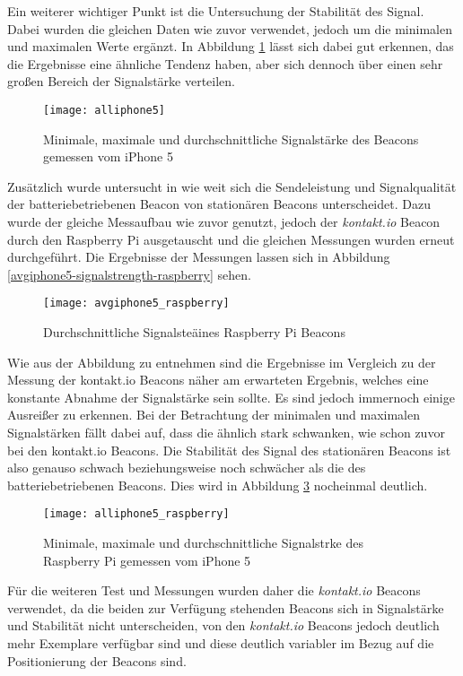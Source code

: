 Ein weiterer wichtiger Punkt ist die Untersuchung der Stabilität des Signal. Dabei wurden die gleichen Daten wie zuvor verwendet, jedoch um die minimalen und maximalen Werte ergänzt. In Abbildung \ref{all-iphone5} lässt sich dabei gut erkennen, das die Ergebnisse eine ähnliche Tendenz haben, aber sich dennoch über einen sehr großen Bereich der Signalstärke verteilen.

\begin{figure}[htb!]
		\centering
	\texttt{[image: alliphone5]}
	\caption{Minimale, maximale und durchschnittliche Signalstärke des Beacons gemessen vom iPhone 5}
	\label{all-iphone5}
\end{figure}


Zusätzlich wurde untersucht in wie weit sich die Sendeleistung und Signalqualität der batteriebetriebenen Beacon von stationären Beacons unterscheidet.
Dazu wurde der gleiche Messaufbau wie zuvor genutzt, jedoch der \emph{kontakt.io} Beacon durch den Raspberry Pi ausgetauscht und die gleichen Messungen wurden erneut durchgeführt. Die Ergebnisse der Messungen lassen sich in Abbildung \ref{avgiphone5-signalstrength-raspberry} sehen.

\begin{figure}[htb!]
		\centering
	\texttt{[image: avgiphone5\_raspberry]}
	\caption{Durchschnittliche Signalsteäines Raspberry Pi Beacons}
		\label{avgiphone5_raspberry}
\end{figure}

Wie aus der Abbildung zu entnehmen sind die Ergebnisse im Vergleich zu der Messung der kontakt.io Beacons näher am erwarteten Ergebnis, welches eine konstante Abnahme der Signalstärke sein sollte. Es sind jedoch immernoch einige Ausreißer zu erkennen. Bei der Betrachtung der minimalen und maximalen Signalstärken fällt dabei auf, dass die ähnlich stark schwanken, wie schon zuvor bei den kontakt.io Beacons. Die Stabilität des Signal des stationären Beacons ist also genauso schwach beziehungsweise noch schwächer als die des batteriebetriebenen Beacons. Dies wird in Abbildung \ref{alliphone5_raspberry} nocheinmal deutlich.

\begin{figure}[htb!]
		\centering
	\texttt{[image: alliphone5\_raspberry]}
	\caption{Minimale, maximale und durchschnittliche Signalstrke des Raspberry Pi gemessen vom iPhone 5}
	\label{alliphone5_raspberry}
\end{figure}

Für die weiteren Test und Messungen wurden daher die \emph{kontakt.io} Beacons verwendet, da die beiden zur Verfügung stehenden Beacons sich in Signalstärke und Stabilität nicht unterscheiden, von den \emph{kontakt.io} Beacons jedoch deutlich mehr Exemplare verfügbar sind und diese deutlich variabler im Bezug auf die Positionierung der Beacons sind.


